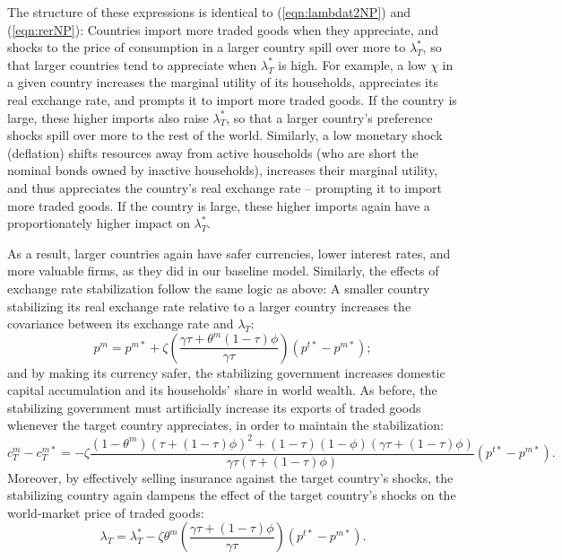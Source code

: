 \documentclass[12pt,letter]{article}
\theoremstyle{break} \theorembodyfont{\normalfont\itshape}
\theoremstyle{break}
\theoremstyle{break} \theorembodyfont{\normalfont\itshape}
\theoremstyle{break} \theorembodyfont{\normalfont\itshape}
\begin{document}
The structure of these expressions is identical to
(\ref{eqn:lambdat2NP}) and (\ref{eqn:rerNP}): Countries import more
traded goods when they appreciate, and shocks to the price of
consumption in a larger country spill over more to $\lambda_{T}^*$, so
that larger countries tend to appreciate when $\lambda_{T}^*$ is high.
For example, a low \(\chi\) in a given country increases the marginal
utility of its households, appreciates its real exchange rate, and
prompts it to import more traded goods. If the country is large, these
higher imports also raise $\lambda_{T}^*$, so that a larger country's
preference shocks spill over more to the rest of the world. Similarly,
a low monetary shock (deflation) shifts resources away from active
households (who are short the nominal bonds owned by inactive
households), increases their marginal utility, and thus appreciates
the country's real exchange rate -- prompting it to import more traded
goods. If the country is large, these higher imports again have a
proportionately higher impact on $\lambda_{T}^*$.

As a result, larger countries again have safer currencies, lower
interest rates, and more valuable firms, as they did in our baseline
model. Similarly, the effects of exchange rate stabilization follow
the same logic as above: A smaller country stabilizing its real
exchange rate relative to a larger country increases the covariance
between its exchange rate and \(\lambda_T\):
\begin{equation*}
  p^m = p^{m \ast}
  + \zeta \left( \frac{\gamma \tau + \theta^m (1 - \tau) \phi}{\gamma
      \tau} \right) (p^{t \ast} - p^{m \ast});
\end{equation*}
and by making its currency safer, the stabilizing government increases
domestic capital accumulation and its households' share in world
wealth. As before, the stabilizing government must artificially
increase its exports of traded goods whenever the target country
appreciates, in order to maintain the stabilization:
\begin{equation*}
  c^m_T - c^{m \ast}_T
  = -\zeta \frac{
    \left( 1 - \theta^m \right) \left( \tau + (1 - \tau) \phi \right)^2
    + (1 - \tau)(1 - \phi)(\gamma \tau + (1 - \tau) \phi)
  }{\gamma \tau \left( \tau + (1 - \tau) \phi \right)}
  \left( p^{t \ast} - p^{m \ast} \right).
\end{equation*}
Moreover, by effectively selling insurance against the target
country's shocks, the stabilizing country again dampens the effect of
the target country's shocks on the world-market price of traded goods:
\begin{equation*}
  \lambda_T = \lambda_T^{\ast}
  - \zeta \theta^m \left(
    \frac{\gamma \tau + (1 - \tau) \phi}{\gamma \tau}
  \right) (p^{t \ast} - p^{m \ast}).
\end{equation*}
\end{document}
